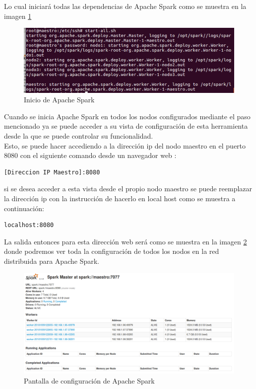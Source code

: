 Lo cual iniciará todas las dependencias de Apache Spark como se muestra en la imagen \ref{fig:iniciaspark}
\begin{figure}[H]
	\hypertarget{fig:iniciaspark}{\hspace{1pt}}
	\begin{center}	
		\includegraphics[width=.8\textwidth]{capitulo5/images/im27.png}
		\caption{Inicio de Apache Spark}
		\label{fig:iniciaspark}
	\end{center}
\end{figure}
Cuando se inicia Apache Spark en todos los nodos configurados mediante el paso mencionado ya se puede acceder a su vista de configuración de esta herramienta desde la que se puede controlar su funcionalidad.
\\
Esto, se puede hacer accediendo a la dirección ip del nodo maestro en el puerto 8080 con el siguiente comando desde un navegador web :
\begin{verbatim}
[Direccion IP Maestro]:8080
\end{verbatim}
si se desea acceder a esta vista desde el propio nodo maestro se puede reemplazar la dirección ip con la instrucción de hacerlo en local host como se muestra a continuación:
\begin{verbatim}
localhost:8080
\end{verbatim}
La salida entonces para esta dirección web será como se muestra en la imagen \ref{fig:salida} donde podremos ver toda la configuración de todos los nodos en la red distribuida para Apache Spark. 
\begin{figure}[H]
	\hypertarget{fig:salida}{\hspace{1pt}}
	\begin{center}	
		\includegraphics[width=.9\textwidth]{capitulo5/images/im28.png}
		\caption{Pantalla de configuración de Apache Spark}
		\label{fig:salida}
	\end{center}
\end{figure}
